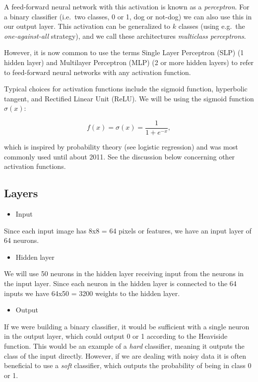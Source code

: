 \documentclass[%
oneside,                 %
final,                   %
10pt]{article}
\begin{document}
A feed-forward neural network with this activation is known as a \emph{perceptron}.  
For a binary classifier (i.e.~two classes, 0 or 1, dog or not-dog) we can also use this in our output layer.  
This activation can be generalized to $k$ classes (using e.g.~the \emph{one-against-all} strategy), 
and we call these architectures \emph{multiclass perceptrons}.  

However, it is now common to use the terms Single Layer Perceptron (SLP) (1 hidden layer) and  
Multilayer Perceptron (MLP) (2 or more hidden layers) to refer to feed-forward neural networks with any activation function.  

Typical choices for activation functions include the sigmoid function, hyperbolic tangent, and Rectified Linear Unit (ReLU).  
We will be using the sigmoid function $\sigma(x)$:  

$$ f(x) = \sigma(x) = \frac{1}{1 + e^{-x}} ,$$

which is inspired by probability theory (see logistic regression) and was most commonly used until about 2011. See the discussion below concerning other activation functions.

\subsection{Layers}

\begin{itemize}
\item Input 
\end{itemize}

\noindent
Since each input image has 8x8 = 64 pixels or features, we have an input layer of 64 neurons.  

\begin{itemize}
\item Hidden layer
\end{itemize}

\noindent
We will use 50 neurons in the hidden layer receiving input from the neurons in the input layer.  
Since each neuron in the hidden layer is connected to the 64 inputs we have 64x50 = 3200 weights to the hidden layer.  

\begin{itemize}
\item Output
\end{itemize}

\noindent
If we were building a binary classifier, it would be sufficient with a single neuron in the output layer,
which could output 0 or 1 according to the Heaviside function. This would be an example of a \emph{hard} classifier, meaning it outputs the class of the input directly. However, if we are dealing with noisy data it is often beneficial to use a \emph{soft} classifier, which outputs the probability of being in class 0 or 1.  
\end{document}
